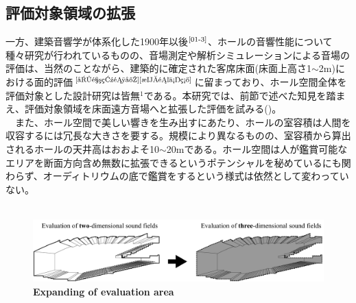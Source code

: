 \newpage
\subsection{評価対象領域の拡張}
一方、建築音響学が体系化した1900年以後$^{\text{\cite{01-3}}}$、ホールの音響性能について種々研究が行われているものの、音場測定や解析シミュレーションによる音場の評価は、当然のことながら、建築的に確定された客席床面(床面上高さ1$\sim$2m)における面的評価$^{\text{\cite{受音点選定}{\cite{最適位置}}}}$に留まっており、ホール空間全体を評価対象とした設計研究は皆無$^1$である。本研究では、前節で述べた知見を踏まえ、評価対象領域を床面遠方音場へと拡張した評価を試みる()。
\\　また、ホール空間で美しい響きを生み出すにあたり、ホールの室容積は人間を収容するには冗長な大きさを要する。規模により異なるものの、室容積から算出されるホールの天井高はおおよそ10$\sim$20mである。ホール空間は人が鑑賞可能なエリアを断面方向含め無数に拡張できるというポテンシャルを秘めているにも関わらず、オーディトリウムの底で鑑賞をするという様式は依然として変わっていない。
\\　
\begin{figure}[htbp]
    \centering
    \includegraphics[keepaspectratio,scale=0.41]{01_att/evaluate_area.pdf}
    \caption{\hspace{1mm}\textbf{Expanding of evaluation area}}
    \label{fig:評価対象領域の拡張}
\end{figure}

\addtocounter{footnote}{1}

\pagebreak
